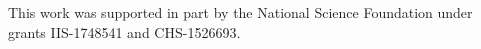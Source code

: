 \documentclass[aps,pre,twocolumn,groupedaddress]{revtex4-2}
\begin{document}


%


\begin{acknowledgments}
This work was supported in part by the National Science Foundation under grants IIS-1748541 and CHS-1526693. 
\end{acknowledgments}


\end{document}
